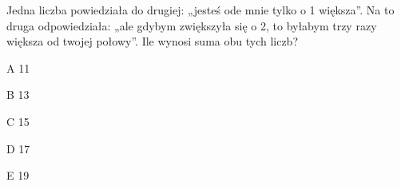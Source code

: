 \begin{tresc}
Jedna liczba powiedziała do drugiej: „jesteś ode mnie tylko o 1 większa”. Na to druga odpowiedziała: „ale gdybym zwiększyła się o 2, to byłabym trzy razy większa od twojej połowy”. Ile wynosi suma obu tych liczb?
\end{tresc}
\begin{wariant}{A} 11 \end{wariant}
\begin{wariant}{B} 13 \end{wariant}
\begin{wariant}{C} 15 \end{wariant}
\begin{wariant}{D} 17 \end{wariant}
\begin{wariant}{E} 19 \end{wariant}
